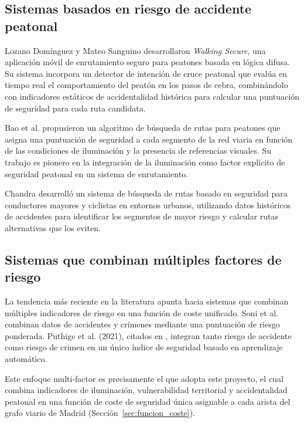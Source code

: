 \subsection{Sistemas basados en riesgo de accidente peatonal}
\label{subsec:trabajos_accidente}

Lozano Domínguez y Mateo Sanguino \cite{lozano2021} desarrollaron \textit{Walking Secure}, una aplicación móvil de enrutamiento seguro para peatones basada en lógica difusa. Su sistema incorpora un detector de intención de cruce peatonal que evalúa en tiempo real el comportamiento del peatón en los pasos de cebra, combinándolo con indicadores estáticos de accidentalidad histórica para calcular una puntuación de seguridad para cada ruta candidata.

Bao et al. \cite{bao2017} propusieron un algoritmo de búsqueda de rutas para peatones que asigna una puntuación de seguridad a cada segmento de la red viaria en función de las condiciones de iluminación y la presencia de referencias visuales. Su trabajo es pionero en la integración de la iluminación como factor explícito de seguridad peatonal en un sistema de enrutamiento.

Chandra \cite{chandra2014} desarrolló un sistema de búsqueda de rutas basado en seguridad para conductores mayores y ciclistas en entornos urbanos, utilizando datos históricos de accidentes para identificar los segmentos de mayor riesgo y calcular rutas alternativas que los eviten.

\subsection{Sistemas que combinan múltiples factores de riesgo}
\label{subsec:trabajos_multifactor}

La tendencia más reciente en la literatura apunta hacia sistemas que combinan múltiples indicadores de riesgo en una función de coste unificado. Soni et al. \cite{soni2019} combinan datos de accidentes y crímenes mediante una puntuación de riesgo ponderada. Puthige et al. (2021), citados en \cite{sohrabi2022}, integran tanto riesgo de accidente como riesgo de crimen en un único índice de seguridad basado en aprendizaje automático.

Este enfoque multi-factor es precisamente el que adopta este proyecto, el cual combina indicadores de iluminación, vulnerabilidad territorial y accidentalidad peatonal en una función de coste de seguridad única asignable a cada arista del grafo viario de Madrid (Sección~\ref{sec:funcion_coste}).

